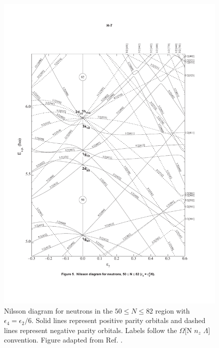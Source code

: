 \begin{figure}[h!]
\centerline{\includegraphics[height=0.8\textheight,clip=true,trim=10 100 10 100]{./img/c2/nilsson_neutron_diagram.pdf}}
	\caption{Nilsson diagram for neutrons in the $50\leq N \leq 82$ region with $\epsilon_4=\epsilon_2/6$. Solid lines represent positive parity orbitals and dashed lines represent negative parity orbitals. Labels follow the $\Omega$[N $n_z$ $\Lambda$] convention. Figure adapted from Ref. \cite{nilssonDiagrams}.\label{fig:chp2-nillson-neutrons}}
\end{figure}

